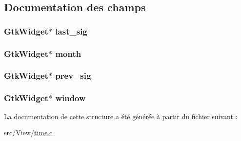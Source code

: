 \subsection{Documentation des champs}
\hypertarget{struct___calendar_data_a622d485dedd866926880ea6f497ab0d0}{
\subsubsection[{last\-\_\-sig}]{\setlength{\rightskip}{0pt plus 5cm}Gtk\-Widget$\ast$ last\-\_\-sig}}\label{struct___calendar_data_a622d485dedd866926880ea6f497ab0d0}
\hypertarget{struct___calendar_data_aaf4edd0a3a5d01ee0e044403180a66e0}{
\subsubsection[{month}]{\setlength{\rightskip}{0pt plus 5cm}Gtk\-Widget$\ast$ month}}\label{struct___calendar_data_aaf4edd0a3a5d01ee0e044403180a66e0}
\hypertarget{struct___calendar_data_aa524f6742b14404edf6891773daae7dd}{
\subsubsection[{prev\-\_\-sig}]{\setlength{\rightskip}{0pt plus 5cm}Gtk\-Widget$\ast$ prev\-\_\-sig}}\label{struct___calendar_data_aa524f6742b14404edf6891773daae7dd}
\hypertarget{struct___calendar_data_a3d346c08cf2d67c388caabffb412b293}{
\subsubsection[{window}]{\setlength{\rightskip}{0pt plus 5cm}Gtk\-Widget$\ast$ window}}\label{struct___calendar_data_a3d346c08cf2d67c388caabffb412b293}


La documentation de cette structure a été générée à partir du fichier suivant \-:\begin{DoxyCompactItemize}
\item 
src/\-View/\hyperlink{time_8c}{time.\-c}\end{DoxyCompactItemize}

